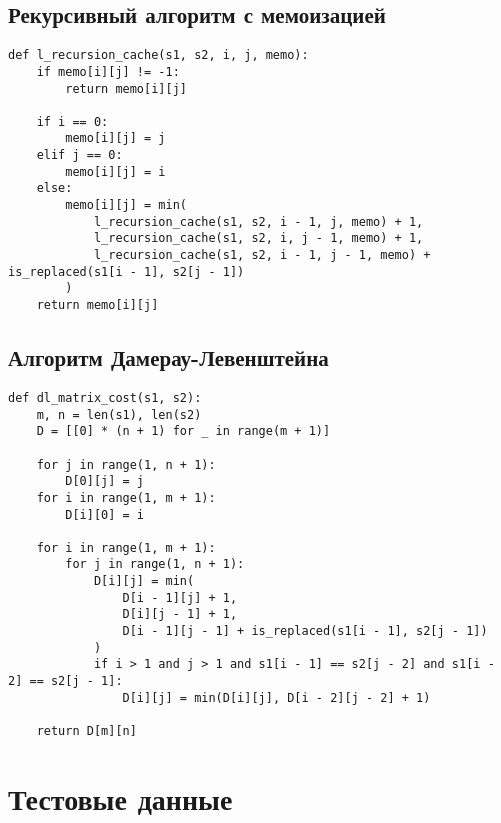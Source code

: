 \subsection{Рекурсивный алгоритм с мемоизацией}

\begin{center}
\begin{lstlisting}[caption={Рекурсивный алгоритм с мемоизацией для поиска расстояния Левенштейна}, label={lst:l_recursion_cache}]
def l_recursion_cache(s1, s2, i, j, memo):
    if memo[i][j] != -1:
        return memo[i][j]

    if i == 0:
        memo[i][j] = j
    elif j == 0:
        memo[i][j] = i
    else:
        memo[i][j] = min(
            l_recursion_cache(s1, s2, i - 1, j, memo) + 1,
            l_recursion_cache(s1, s2, i, j - 1, memo) + 1,
            l_recursion_cache(s1, s2, i - 1, j - 1, memo) + is_replaced(s1[i - 1], s2[j - 1])
        )
    return memo[i][j]
\end{lstlisting}
\end{center}

\subsection{Алгоритм Дамерау-Левенштейна}

\begin{center}
\begin{lstlisting}[caption={Алгоритм поиска расстояния Дамерау-Левенштейна}, label={lst:dl_matrix}]
def dl_matrix_cost(s1, s2):
    m, n = len(s1), len(s2)
    D = [[0] * (n + 1) for _ in range(m + 1)]

    for j in range(1, n + 1):
        D[0][j] = j
    for i in range(1, m + 1):
        D[i][0] = i

    for i in range(1, m + 1):
        for j in range(1, n + 1):
            D[i][j] = min(
                D[i - 1][j] + 1,
                D[i][j - 1] + 1,
                D[i - 1][j - 1] + is_replaced(s1[i - 1], s2[j - 1])
            )
            if i > 1 and j > 1 and s1[i - 1] == s2[j - 2] and s1[i - 2] == s2[j - 1]:
                D[i][j] = min(D[i][j], D[i - 2][j - 2] + 1)

    return D[m][n]
\end{lstlisting}
\end{center}

\section{Тестовые данные}

